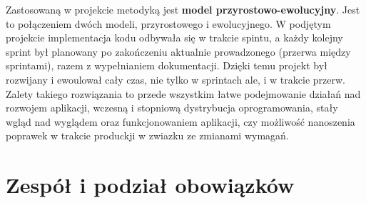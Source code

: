 \begin{chap5}
\begin{flushleft}
        \indent Zastosowaną w projekcie metodyką jest \textbf{model przyrostowo-ewolucyjny}.
        Jest to połączeniem dwóch modeli, przyrostowego i ewolucyjnego.
        W podjętym projekcie implementacja kodu odbywała się w trakcie spintu, a każdy kolejny sprint był planowany po
        zakończeniu aktualnie prowadzonego (przerwa między sprintami), razem z wypełnianiem dokumentacji.
        Dzięki temu projekt był rozwijany i ewoulował cały czas, nie tylko w sprintach ale, i w trakcie przerw.
        Zalety takiego rozwiązania to przede wszystkim łatwe podejmowanie działań nad rozwojem aplikacji,
        wczesną i stopniową dystrybucja oprogramowania, stały wgląd nad wyglądem oraz funkcjonowaniem aplikacji,
        czy możliwość nanoszenia poprawek w trakcie produckji w zwiazku ze zmianami wymagań.

        \section{Zespół i podział obowiązków}




    \end{flushleft}
    \clearpage
\end{chap5}

